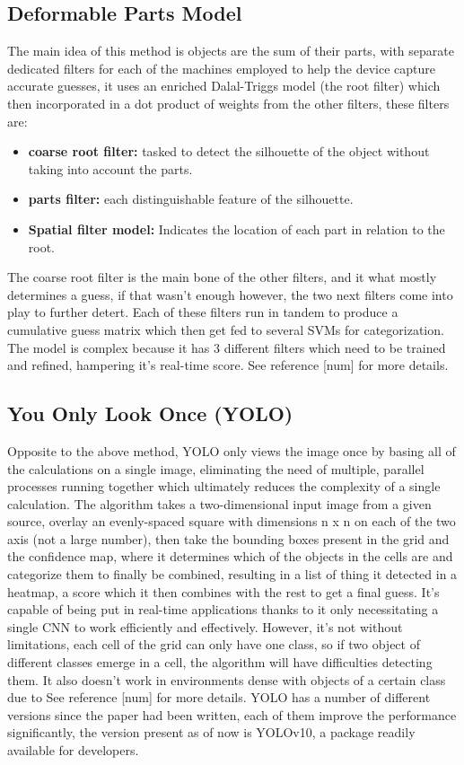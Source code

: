 \subsection{Deformable Parts Model}
The main idea of this method is objects are the sum of their parts, with separate dedicated filters for each of the machines employed to help the device capture accurate guesses, 
it uses an enriched Dalal-Triggs model (the root filter) which then incorporated in a dot product of weights from the other filters, these filters are:
\begin{itemize}
	\item \textbf{coarse root filter:} tasked to detect the silhouette of the object without taking
	into account the parts.
	\item \textbf{parts filter:} each distinguishable feature of the silhouette.
	\item \textbf{Spatial filter model:} Indicates the location of each part in relation to the root.
\end{itemize}
The coarse root filter is the main bone of the other filters, and it what mostly determines a guess, if that wasn't enough however, the two next filters come into play to further detert.
 Each of these filters run in tandem to produce a cumulative guess matrix which then get fed to several SVMs for categorization. The model is complex because it has 3 different filters which need to be trained and refined, hampering it's real-time score.
See reference [num] for more details.

\subsection{You Only Look Once (YOLO)}
Opposite to the above method, YOLO only views the image once by basing all of the calculations on a single image, eliminating the need of multiple, parallel processes running together which ultimately reduces the complexity of a single calculation. The algorithm takes a two-dimensional input image from a given source, overlay an evenly-spaced square with dimensions n x n on each of the two axis (not a large number), then take the  bounding boxes present in the grid and the confidence map, where it determines which of the objects in the cells are and categorize them to finally be combined, resulting in a list of thing it detected in a heatmap, a score which it then combines with the rest to get a final guess. It's capable of being put in real-time applications thanks to it only necessitating a single CNN to work efficiently and effectively. 
However, it's not without limitations, each cell of the grid can only have one class, so if two object of different classes emerge in a cell, the algorithm will have difficulties detecting them. It also doesn't work in environments dense with objects of a certain class due to 
See reference [num] for more details.
YOLO has a number of different versions since the paper had been written, each of them improve the performance significantly, the version present as of now is YOLOv10, a package readily available for developers.